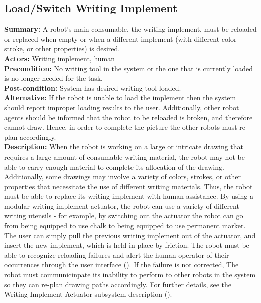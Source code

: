 \subsection{Load/Switch Writing Implement}
\textbf{Summary:} A robot's main consumable, the writing implement, must be reloaded or replaced when empty or when a different implement (with different color stroke, or other properties) is desired. \\
\textbf{Actors:}  Writing implement, human \\
\textbf{Precondition:} No writing tool in the system or the one that is currently loaded is no longer needed for the task. \\
\textbf{Post-condition:} System has desired writing tool loaded. \\
\textbf{Alternative:} If the robot is unable to load the implement then the system should report improper loading results to the user. Additionally, other robot agents should be informed that the robot to be reloaded is broken, and therefore cannot draw. Hence, in order to complete the picture the other robots must re-plan accordingly. \\
\textbf{Description:} When the robot is working on a large or intricate drawing that requires a large amount of consumable writing material, the robot may not be able to carry enough material to complete its allocation of the drawing. Additionally, some drawings may involve a variety of colors, strokes, or other properties that necessitate the use of different writing materials. Thus, the robot must be able to replace its writing implement with human assistance. By using a modular writing implement actuator, the robot can use a variety of different writing utensils - for example, by switching out the actuator the robot can go from being equipped to use chalk to being equipped to use permanent marker. The user can simply pull the previous writing implement out of the actuator, and insert the new implement, which is held in place by friction. The robot must be able to recognize reloading failures and alert the human operator of their occurrences through the user interface (). If the failure is not corrected, The robot must communicinpate its inability to perform to other robots in the system so they can re-plan drawing paths accordingly. For further details, see the Writing Implement Actuator subsystem description ().\\

